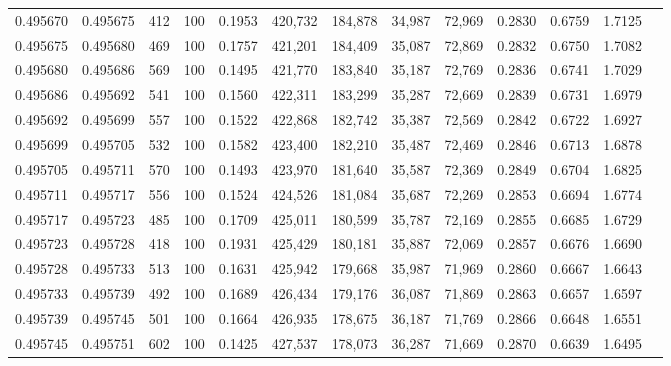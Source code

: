 \begin{tabular}{rrrrrrrrrrrrr}
0.495670 & 0.495675 &   412 & 100 &                                     0.1953 & 420,732 & 184,878 &  34,987 &  72,969 & 0.2830 & 0.6759 & 1.7125 \\
0.495675 & 0.495680 &   469 & 100 &                                     0.1757 & 421,201 & 184,409 &  35,087 &  72,869 & 0.2832 & 0.6750 & 1.7082 \\
0.495680 & 0.495686 &   569 & 100 &                                     0.1495 & 421,770 & 183,840 &  35,187 &  72,769 & 0.2836 & 0.6741 & 1.7029 \\
0.495686 & 0.495692 &   541 & 100 &                                     0.1560 & 422,311 & 183,299 &  35,287 &  72,669 & 0.2839 & 0.6731 & 1.6979 \\
0.495692 & 0.495699 &   557 & 100 &                                     0.1522 & 422,868 & 182,742 &  35,387 &  72,569 & 0.2842 & 0.6722 & 1.6927 \\
0.495699 & 0.495705 &   532 & 100 &                                     0.1582 & 423,400 & 182,210 &  35,487 &  72,469 & 0.2846 & 0.6713 & 1.6878 \\
0.495705 & 0.495711 &   570 & 100 &                                     0.1493 & 423,970 & 181,640 &  35,587 &  72,369 & 0.2849 & 0.6704 & 1.6825 \\
0.495711 & 0.495717 &   556 & 100 &                                     0.1524 & 424,526 & 181,084 &  35,687 &  72,269 & 0.2853 & 0.6694 & 1.6774 \\
0.495717 & 0.495723 &   485 & 100 &                                     0.1709 & 425,011 & 180,599 &  35,787 &  72,169 & 0.2855 & 0.6685 & 1.6729 \\
0.495723 & 0.495728 &   418 & 100 &                                     0.1931 & 425,429 & 180,181 &  35,887 &  72,069 & 0.2857 & 0.6676 & 1.6690 \\
0.495728 & 0.495733 &   513 & 100 &                                     0.1631 & 425,942 & 179,668 &  35,987 &  71,969 & 0.2860 & 0.6667 & 1.6643 \\
0.495733 & 0.495739 &   492 & 100 &                                     0.1689 & 426,434 & 179,176 &  36,087 &  71,869 & 0.2863 & 0.6657 & 1.6597 \\
0.495739 & 0.495745 &   501 & 100 &                                     0.1664 & 426,935 & 178,675 &  36,187 &  71,769 & 0.2866 & 0.6648 & 1.6551 \\
0.495745 & 0.495751 &   602 & 100 &                                     0.1425 & 427,537 & 178,073 &  36,287 &  71,669 & 0.2870 & 0.6639 & 1.6495 \\

\end{tabular}
